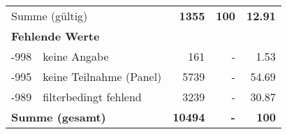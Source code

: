 \begin{longtable}{lXrrr}
     \midrule
     \multicolumn{2}{l}{Summe (gültig)} &
       \textbf{\num{1355}} &
     \textbf{100} &
       \textbf{\num[round-mode=places,round-precision=2]{12,91}} \\
     \multicolumn{5}{l}{\textbf{Fehlende Werte}}\\
       -998 &
       keine Angabe &
         \num{161} &
        - &
         \num[round-mode=places,round-precision=2]{1,53} \\
       -995 &
       keine Teilnahme (Panel) &
         \num{5739} &
        - &
         \num[round-mode=places,round-precision=2]{54,69} \\
       -989 &
       filterbedingt fehlend &
         \num{3239} &
        - &
         \num[round-mode=places,round-precision=2]{30,87} \\
     \midrule
     \multicolumn{2}{l}{\textbf{Summe (gesamt)}} &
          \textbf{\num{10494}} &
        \textbf{-} &
        \textbf{100} \\
     \bottomrule
     \end{longtable}
     
